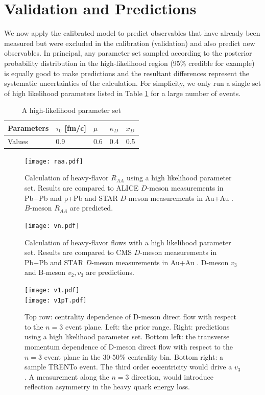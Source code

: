 \documentclass[aps, prc, reprint, amsmath, groupedaddress, nofootinbib]{revtex4-1}
\begin{document}
\section{Validation and Predictions}\label{section:prediction}
We now apply the calibrated model to predict observables that have already been measured but were excluded in the calibration (validation) and also predict new observables.
In principal, any parameter set sampled according to the posterior probability distribution in the high-likelihood region (95\% credible for example) is equally good to make predictions and the resultant differences represent the systematic uncertainties of the calculation.
For simplicity, we only run a single set of high likelihood parameters listed in Table \ref{table:high-likelihood-parameters} for a large number of events.
\begin{table}
\caption{A high-likelihood parameter set}\label{table:high-likelihood-parameters}
\begin{tabularx}{\columnwidth}{XXXXX}
\hline
Parameters & $\tau_0$ [fm/c] & $\mu$ & $\kappa_D$ & $x_D$   \\
\hline
Values & 0.9 & 0.6 & 0.4 & 0.5\\
\hline
\end{tabularx}
\end{table} 
\begin{figure}
\texttt{[image: raa.pdf]}
\caption{Calculation of heavy-flavor $R_{AA}$ using a high likelihood parameter set. Results are compared to ALICE $D$-meson measurements in Pb+Pb and p+Pb \cite{Abelev:2014hha,Abelev:2014hha} and STAR $D$-meson measurements in Au+Au \cite{Xie:2016iwq}. $B$-meson $R_{AA}$ are predicted.}\label{plots:pred:raa}
\end{figure}
\begin{figure}
\texttt{[image: vn.pdf]}
\caption{Calculation of heavy-flavor flows with a high likelihood parameter set. Results are compared to CMS $D$-meson measurements in Pb+Pb \cite{Sirunyan:2017plt} and STAR $D$-meson measurements in Au+Au \cite{Adamczyk:2017xur}. D-meson $v_3$ and B-meson $v_2, v_3$ are predictions.}\label{plots:pred:vn}
\end{figure}
\begin{figure}
\texttt{[image: v1.pdf]}\\
\texttt{[image: v1pT.pdf]}
\caption{Top row: centrality dependence of D-meson direct flow with respect to the $n=3$ event plane. Left: the prior range. Right: predictions using a high likelihood parameter set. Bottom left: the transverse momentum dependence of D-meson direct flow with respect to the $n=3$ event plane in the 30-50\% centrality bin. Bottom right: a sample TRENTo event. The third order eccentricity would drive a $v_3$. A measurement along the $n=3$ direction, would introduce reflection asymmetry in the heavy quark energy loss.}\label{plots:pred:v1}
\end{figure}
\end{document}
